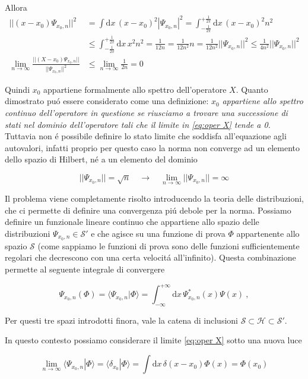 \begin{enumerate}
Allora
\begin{align*}
	||(x-x_{0})\Psi_{x_{0},n}||^{2}
	&=\int\mathrm{d}x\,(x-x_{0})^{2}|\Psi_{x_{0},n}|^{2}=\int_{-\frac{1}{2\pi}}^{+\frac{1}{2\pi}}\mathrm{d}x\,(x-x_{0})^{2}n^{2}
	\\
	&\leq\int_{-\frac{1}{2\pi}}^{+\frac{1}{2\pi}}\mathrm{d}x\,x^{2}n^{2}=\frac{1}{12n}=\frac{1}{12n^{2}}n=\frac{1}{12n^{2}}||\Psi_{x_{0},n}||^{2}\leq\frac{1}{4n^{2}}||\Psi_{x_{0},n}||^{2}
	\\ 
	\lim_{n\to\infty}\frac{||(X-x_{0})\Psi_{x_{0},n}||}{||\Psi_{x_{0},n}||^{2}}
	&\leq\lim_{n\to\infty}\frac{1}{2n}=0
\end{align*}

Quindi $x_0$ appartiene formalmente allo spettro dell'operatore $X$. Quanto dimostrato pu\'o essere considerato come una definizione: $x_0$ \textit{appartiene allo spettro continuo dell'operatore in questione se riusciamo a trovare una successione di stati nel dominio dell'operatore tali che il limite in \ref{eq:oper X} tende a 0.} Tuttavia non \'e possibile definire lo stato limite che soddisfa all'equazione agli autovalori, infatti proprio per questo caso la norma non converge ad un elemento dello spazio di Hilbert, n\'e a un elemento del dominio
	
$$||\Psi_{x_{0},n}||={\sqrt{n}}\quad\longrightarrow\quad\operatorname*{lim}_{n\longrightarrow\infty}||\Psi_{x_{0},n}||=\infty$$

Il problema viene completamente risolto introducendo la teoria delle distribuzioni, che ci permette di definire una convergenza pi\'u debole per la norma. Possiamo definire un funzionale lineare continuo che appartiene allo spazio delle distribuzioni $\Psi_{x_0,n} \in \mathcal{S}'$ e che agisce su una funzione di prova $\Phi$ appartenente allo spazio $\mathcal{S}$ (come sappiamo le funzioni di prova sono delle funzioni sufficientemente regolari che decrescono con una certa velocit\'a all'infinito). Questa combinazione permette al seguente integrale di convergere

$$\Psi_{x_{0},n}(\Phi)=\langle\Psi_{x_{0},n}|\Phi\rangle=\int_{-\infty}^{+\infty}\mathrm{d}x\,\Psi_{x_{0},n}^{*}(x)\Psi(x)\ ,$$

Per questi tre spazi introdotti finora, vale la catena di inclusioni $\mathcal{S} \subset \mathcal{H} \subset \mathcal{S}'$.

In questo contesto possiamo considerare il limite \ref{eq:oper X} sotto una nuova luce

$$\operatorname*{lim}_{n\to\infty}\langle\Psi_{x_{0},n}|\Phi\rangle=\langle\delta_{x_{0}}|\Phi\rangle=\int\mathrm{d}x\,\delta(x-x_{0})\Phi(x)=\Phi(x_{0})$$


\end{enumerate}
